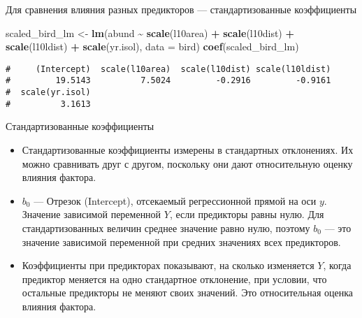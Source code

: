 \documentclass[
  ignorenonframetext,
  t,xcolor=table]{beamer}
\newenvironment{Shaded}{\begin{snugshade}}{\end{snugshade}}
\newcommand{\AttributeTok}[1]{\textcolor[rgb]{0.13,0.29,0.53}{#1}}
\newcommand{\FunctionTok}[1]{\textcolor[rgb]{0.13,0.29,0.53}{\textbf{#1}}}
\newcommand{\NormalTok}[1]{#1}
\newcommand{\OtherTok}[1]{\textcolor[rgb]{0.56,0.35,0.01}{#1}}
\newcommand{\SpecialCharTok}[1]{\textcolor[rgb]{0.81,0.36,0.00}{\textbf{#1}}}
\providecommand{\tightlist}{%
  \setlength{\itemsep}{0pt}\setlength{\parskip}{0pt}}
\begin{document}
\begin{frame}[fragile]{Для сравнения влияния разных предикторов ---
стандартизованные коэффициенты}
\protect\hypertarget{ux434ux43bux44f-ux441ux440ux430ux432ux43dux435ux43dux438ux44f-ux432ux43bux438ux44fux43dux438ux44f-ux440ux430ux437ux43dux44bux445-ux43fux440ux435ux434ux438ux43aux442ux43eux440ux43eux432-ux441ux442ux430ux43dux434ux430ux440ux442ux438ux437ux43eux432ux430ux43dux43dux44bux435-ux43aux43eux44dux444ux444ux438ux446ux438ux435ux43dux442ux44b}{}
\fontsize{10pt}{10pt}

\begin{Shaded}
\begin{Highlighting}[]
\NormalTok{scaled\_bird\_lm }\OtherTok{\textless{}{-}} \FunctionTok{lm}\NormalTok{(abund }\SpecialCharTok{\textasciitilde{}} \FunctionTok{scale}\NormalTok{(l10area) }\SpecialCharTok{+} \FunctionTok{scale}\NormalTok{(l10dist) }\SpecialCharTok{+} 
                       \FunctionTok{scale}\NormalTok{(l10ldist) }\SpecialCharTok{+} \FunctionTok{scale}\NormalTok{(yr.isol), }\AttributeTok{data =}\NormalTok{ bird)}
\FunctionTok{coef}\NormalTok{(scaled\_bird\_lm)}
\end{Highlighting}
\end{Shaded}

\begin{verbatim}
#     (Intercept)  scale(l10area)  scale(l10dist) scale(l10ldist) 
#         19.5143          7.5024         -0.2916         -0.9161 
#  scale(yr.isol) 
#          3.1613
\end{verbatim}

\pause

\begin{block}{Стандартизованные коэффициенты}
\protect\hypertarget{ux441ux442ux430ux43dux434ux430ux440ux442ux438ux437ux43eux432ux430ux43dux43dux44bux435-ux43aux43eux44dux444ux444ux438ux446ux438ux435ux43dux442ux44b}{}
\begin{itemize}
\tightlist
\item
  Стандартизованные коэффициенты измерены в стандартных отклонениях. Их
  можно сравнивать друг с другом, поскольку они дают относительную
  оценку влияния фактора.
\item
  \(b_0\) --- Отрезок (Intercept), отсекаемый регрессионной прямой на
  оси \(y\). Значение зависимой переменной \(Y\), если предикторы равны
  нулю. Для стандартизованных величин среднее значение равно нулю,
  поэтому \(b_0\) --- это значение зависимой переменной при средних
  значениях всех предикторов.
\item
  Коэффициенты при предикторах показывают, на сколько изменяется \(Y\),
  когда предиктор меняется на одно стандартное отклонение, при условии,
  что остальные предикторы не меняют своих значений. Это относительная
  оценка влияния фактора.
\end{itemize}
\end{block}
\end{frame}
\end{document}
